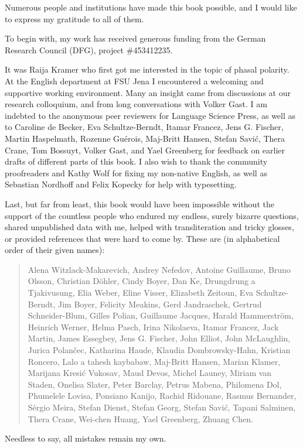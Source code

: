 \addchap{\lsAcknowledgementTitle} 
 Numerous people and institutions have made this book possible, and I would like to express my gratitude to all of them.
 
To begin with, my work has received generous funding from the German Research Council (DFG), project \#{}453412235.
 
 
It was Raija Kramer who first got me interested in the topic of phasal polarity.  At the English department at FSU Jena I encountered a welcoming and supportive working environment. Many an insight came from discussions at our research colloquium, and from long conversations with Volker Gast. I am indebted to the anonymous peer reviewers for Language Science Press, as well as to Caroline de Becker, Eva Schultze-Berndt, Itamar Francez, Jens G. Fischer, Martin Haspelmath, Rozenne Guérois, Maj-Britt Hansen, Stefan Savić, Thera Crane, Tom Bossuyt, Volker Gast, and Yael Greenberg for feedback on earlier drafts of different parts of this book. I also wish to thank the community proofreaders and Kathy Wolf for fixing my non-native English, as well as Sebastian Nordhoff and Felix Kopecky for help with typesetting.

Last, but far from least, this book would have been impossible without the support of the countless people who endured my endless, surely bizarre questions, shared unpublished data with me, helped with transliteration and tricky glosses, or provided references that were hard to come by. These are (in alphabetical order of their given names): 

\begin{quote}
Alena Witzlack-Makarevich, Andrey Nefedov, Antoine Guillaume, Bruno Olsson, Christian Döhler, Cindy Boyer, Dan Ke, Drungdrung a Tjakivusung, Elia Weber, Eline Visser, Elizabeth Zeitoun, Eva Schultze-Berndt, Jim Boyer, Felicity Meakins, Gerd Jandraschek, Gertrud Schneider-Blum, Gilles Polian, Guillaume Jacques, Harald Hammerström, Heinrich Werner, Helma Pasch, Irina Nikolaeva, Itamar Francez, Jack Martin, James Essegbey, Jens G. Fischer, John Elliot, John McLaughlin, Jurica Polančec, Katharina Haude, Klaudia Dombrowsky-Hahn, Kristian Roncero, Lalo a tahesh kaybabaw, Maj-Britt Hansen, Marian Klamer, Marijana Kresić Vukosav, Maud Devos, Michel Launey, Miriam van Staden, Onelisa Slater, Peter Barclay, Petrus Mabena, Philomena Dol, Phumelele Lovisa, Ponsiano Kanijo, Rachid Ridouane, Rasmus Bernander, Sérgio Meira, Stefan Dienst, Stefan Georg, Stefan Savić, Tapani Salminen, Thera Crane, Wei-chen Huang, Yael Greenberg, Zhuang Chen.
\end{quote}

Needless to say, all mistakes remain my own.
